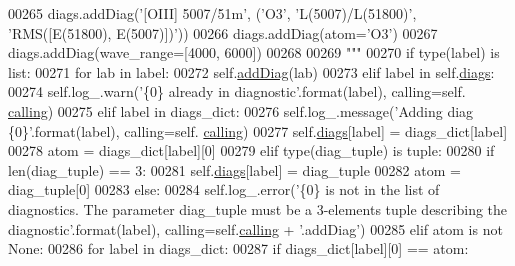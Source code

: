 \begin{DoxyCode}
00265 \textcolor{stringliteral}{        diags.addDiag('[OIII] 5007/51m', ('O3', 'L(5007)/L(51800)', 'RMS([E(51800), E(5007)])'))}
00266 \textcolor{stringliteral}{        diags.addDiag(atom='O3')}
00267 \textcolor{stringliteral}{        diags.addDiag(wave\_range=[4000, 6000])}
00268 \textcolor{stringliteral}{}
00269 \textcolor{stringliteral}{        """}
00270         \textcolor{keywordflow}{if} type(label) \textcolor{keywordflow}{is} list:
00271             \textcolor{keywordflow}{for} lab \textcolor{keywordflow}{in} label:
00272                 self.\hyperlink{classpyneb_1_1core_1_1diags_1_1_diagnostics_a508fa9c5a2216f9eb4128338c33a6f75}{addDiag}(lab)
00273         \textcolor{keywordflow}{elif} label \textcolor{keywordflow}{in} self.\hyperlink{classpyneb_1_1core_1_1diags_1_1_diagnostics_a0c0f7e36097677f61a6a14a0c3127b02}{diags}:
00274             self.log\_.warn(\textcolor{stringliteral}{'\{0\} already in diagnostic'}.format(label), calling=self.
      \hyperlink{classpyneb_1_1core_1_1diags_1_1_diagnostics_a07dce673fec8b2383ef411ab94b0b2fe}{calling})
00275         \textcolor{keywordflow}{elif} label \textcolor{keywordflow}{in} diags\_dict:
00276             self.log\_.message(\textcolor{stringliteral}{'Adding diag \{0\}'}.format(label), calling=self.
      \hyperlink{classpyneb_1_1core_1_1diags_1_1_diagnostics_a07dce673fec8b2383ef411ab94b0b2fe}{calling})
00277             self.\hyperlink{classpyneb_1_1core_1_1diags_1_1_diagnostics_a0c0f7e36097677f61a6a14a0c3127b02}{diags}[label] = diags\_dict[label]
00278             atom = diags\_dict[label][0]
00279         \textcolor{keywordflow}{elif} type(diag\_tuple) \textcolor{keywordflow}{is} tuple:
00280             \textcolor{keywordflow}{if} len(diag\_tuple) == 3:    
00281                 self.\hyperlink{classpyneb_1_1core_1_1diags_1_1_diagnostics_a0c0f7e36097677f61a6a14a0c3127b02}{diags}[label] = diag\_tuple
00282                 atom = diag\_tuple[0]
00283             \textcolor{keywordflow}{else}:
00284                 self.log\_.error(\textcolor{stringliteral}{'\{0\} is not in the list of diagnostics. The parameter diag\_tuple must be a
       3-elements tuple describing the diagnostic'}.format(label), calling=self.\hyperlink{classpyneb_1_1core_1_1diags_1_1_diagnostics_a07dce673fec8b2383ef411ab94b0b2fe}{calling} + \textcolor{stringliteral}{'.addDiag'})
00285         \textcolor{keywordflow}{elif} atom \textcolor{keywordflow}{is} \textcolor{keywordflow}{not} \textcolor{keywordtype}{None}:
00286             \textcolor{keywordflow}{for} label \textcolor{keywordflow}{in} diags\_dict:
00287                 \textcolor{keywordflow}{if} diags\_dict[label][0] == atom:

\end{DoxyCode}
